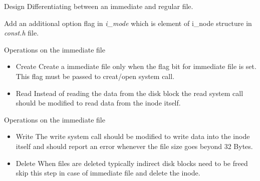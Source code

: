 \documentclass{beamer}
\begin{document}
\begin{frame}{Design}
Differentiating between an immediate and regular file. \linebreak
\begin{small}
Add an additional option flag in { \em i\_mode } which is element of i\_node structure in { \em const.h} file. 
\end{small}
\begin{tiny}

\end{tiny}
\end{frame}

\begin{frame}{Operations on the immediate file}
\begin{itemize}
\item Create \linebreak
Create a immediate file only when the flag bit for immediate file is set. This flag must be passed to creat/open system call.\linebreak
\item Read \linebreak
Instead of reading the data from the disk block the read system call should be modified to read data from the inode itself. \linebreak
\end{itemize}
\end{frame}


\begin{frame}{Operations on the immediate file}
\begin{itemize}
\item Write \linebreak
The write system call should be modified to write data into the inode itself and should report an error whenever the file size goes beyond 32 Bytes.\linebreak
\item Delete	\linebreak
When files are deleted typically indirect disk blocks need to be freed skip this step in case of immediate file and delete the inode. \linebreak
\end{itemize}
\end{frame}









%
\end{document}
